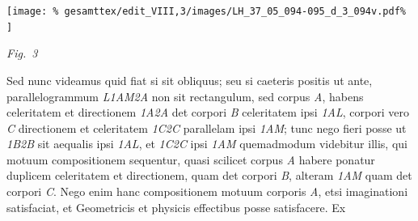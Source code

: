 \vspace{1.0em} %
\centerline{%
\texttt{[image: \%
gesamttex/edit\_VIII,3/images/LH\_37\_05\_094-095\_d\_3\_094v.pdf\%
]}} 
\vspace{0.5em}
\centerline{%
\lbrack\textit{Fig.~3}\rbrack%
}
\vspace{1em}
%
\pstart
Sed
%
nunc videamus quid fiat si sit obliquus;%
\protect{} 
%
seu si caeteris positis ut ante, parallelogrammum 
%
\textit{L{\scriptsize1}AM{\scriptsize2}A} non sit rectangulum,%
\protect{} sed %
% 
%
corpus \textit{A}, habens celeritatem%
\protect{} et directionem%
\protect{} \textit{{\scriptsize1}A{\scriptsize2}A} det corpori \textit{B} celeritatem %
% 
%
ipsi \textit{{\scriptsize1}AL}, corpori vero \textit{C} directionem et celeritatem
%
\textit{{\scriptsize1}C{\scriptsize2}C} parallelam ipsi \textit{{\scriptsize1}AM}; 
%
tunc nego fieri posse ut \textit{{\scriptsize1}B{\scriptsize2}B} sit aequalis ipsi 
%
\textit{{\scriptsize1}AL}, et \textit{{\scriptsize1}C{\scriptsize2}C} ipsi \textit{{\scriptsize1}AM} 
%
quemadmodum videbitur illis, qui motuum compositionem%
\protect{} sequentur, quasi scilicet corpus 
%
\textit{A} habere ponatur duplicem celeritatem et directionem, %
% 
%
quam det corpori \textit{B}, alteram \textit{{\scriptsize1}AM} quam det corpori \textit{C}. 
%
Nego enim hanc compositionem motuum corporis \textit{A}, etsi imaginationi%
\protect{} satisfaciat, et Geometricis %
% 
%
et physicis effectibus\protect{} posse satisfacere. Ex %
